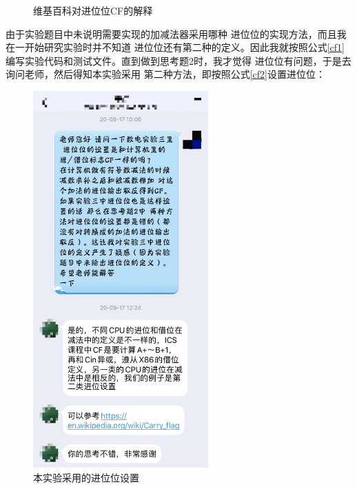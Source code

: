 \documentclass[12pt,a4paper,UTF8]{article}
\begin{document}
\begin{itemize}
\begin{figure}[H]
          \caption{维基百科对进位位CF的解释}
          \label{cf_def}
        \end{figure}
        由于实验题目中未说明需要实现的加减法器采用哪种
        进位位的实现方法，而且我在一开始研究实验时并不知道
        进位位还有第二种的定义。因此我就按照公式\eqref{cf1}
        编写实验代码和测试文件。直到做到思考题2时，我才觉得
        进位位有问题，于是去询问老师，然后得知本实验采用
        第二种方法，即按照公式\eqref{cf2}设置进位位：
        \begin{figure}[H]
          \centering
          \includegraphics[width=0.6\textwidth]{cf_explanation.JPG}
          \caption{本实验采用的进位位设置}
          \label{cf_explanation}
        \end{figure}


\end{itemize}
\end{document}

